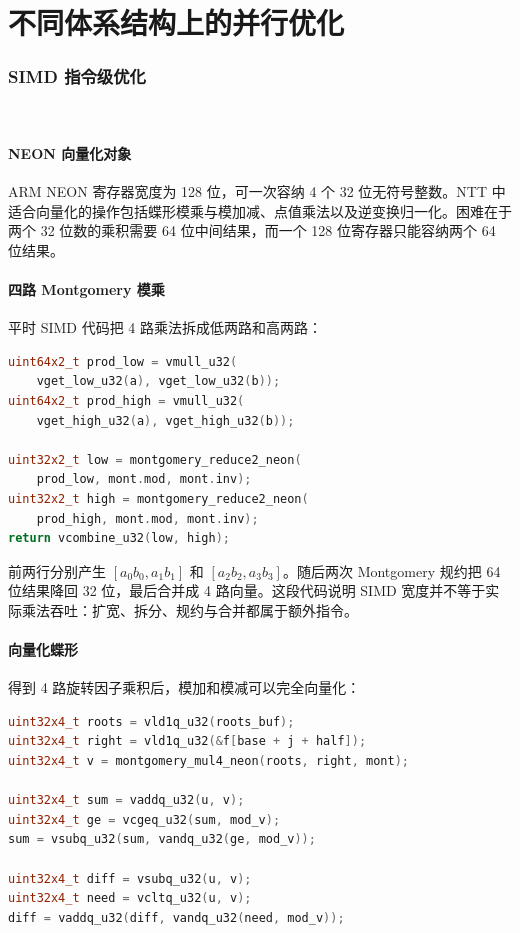 \part{不同体系结构上的并行优化}

\section{SIMD 指令级优化}\oldwork\ \fusionwork

\subsection{NEON 向量化对象}

ARM NEON 寄存器宽度为 128 位，可一次容纳 4 个 32 位无符号整数。NTT 中适合向量化的操作包括蝶形模乘与模加减、点值乘法以及逆变换归一化。困难在于两个 32 位数的乘积需要 64 位中间结果，而一个 128 位寄存器只能容纳两个 64 位结果。

\subsection{四路 Montgomery 模乘}

平时 SIMD 代码把 4 路乘法拆成低两路和高两路：

\begin{lstlisting}[title=NEON四路乘法的低高两组拆分,label={lst:neon-mul},language={C++}]
uint64x2_t prod_low = vmull_u32(
    vget_low_u32(a), vget_low_u32(b));
uint64x2_t prod_high = vmull_u32(
    vget_high_u32(a), vget_high_u32(b));

uint32x2_t low = montgomery_reduce2_neon(
    prod_low, mont.mod, mont.inv);
uint32x2_t high = montgomery_reduce2_neon(
    prod_high, mont.mod, mont.inv);
return vcombine_u32(low, high);
\end{lstlisting}

前两行分别产生 $[a_0b_0,a_1b_1]$ 和 $[a_2b_2,a_3b_3]$。随后两次 Montgomery 规约把 64 位结果降回 32 位，最后合并成 4 路向量。这段代码说明 SIMD 宽度并不等于实际乘法吞吐：扩宽、拆分、规约与合并都属于额外指令。

\subsection{向量化蝶形}

得到 4 路旋转因子乘积后，模加和模减可以完全向量化：

\begin{lstlisting}[title=NEON向量化模加和模减,label={lst:neon-butterfly},language={C++}]
uint32x4_t roots = vld1q_u32(roots_buf);
uint32x4_t right = vld1q_u32(&f[base + j + half]);
uint32x4_t v = montgomery_mul4_neon(roots, right, mont);

uint32x4_t sum = vaddq_u32(u, v);
uint32x4_t ge = vcgeq_u32(sum, mod_v);
sum = vsubq_u32(sum, vandq_u32(ge, mod_v));

uint32x4_t diff = vsubq_u32(u, v);
uint32x4_t need = vcltq_u32(u, v);
diff = vaddq_u32(diff, vandq_u32(need, mod_v));
\end{lstlisting}

